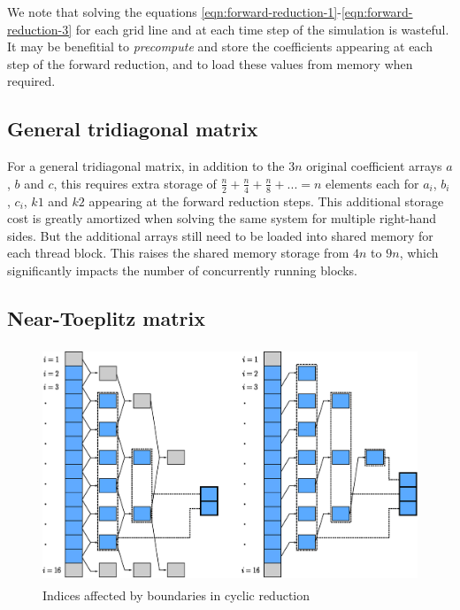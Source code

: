 \documentclass{elsarticle}
\begin{document}
We note that solving the equations
\ref{eqn:forward-reduction-1}-\ref{eqn:forward-reduction-3}
for each grid line and at each time step of the simulation
is wasteful.
It may be benefitial to
\emph{precompute} and store the coefficients appearing at
each step of the forward reduction,
and to load these values from memory when required.

\subsection{General tridiagonal matrix}

For a general tridiagonal matrix,
in addition to the $3n$ original coefficient arrays
$a$, $b$ and $c$,
this requires extra storage of 
$\frac{n}{2}+\frac{n}{4}+\frac{n}{8}+...=n$
elements each
for $a_i$, $b_i$, $c_i$, $k1$ and $k2$
appearing at the forward reduction steps.
This additional storage cost is greatly amortized
when solving the same system for multiple right-hand sides.
But the additional arrays
still need to be loaded into shared memory for each thread block.
This raises the shared memory storage from $4n$ to $9n$,
which significantly impacts the number of
concurrently running blocks.

\subsection{Near-Toeplitz matrix}

\begin{figure}[h!]
\begin{center}
\includegraphics[height=200pt]{img/cyclic-reduction-boundaries.eps}
\end{center}
\caption{Indices affected by boundaries in cyclic reduction}
\label{fig:cyclic-reduction-boundaries}
\end{figure}
\end{document}
